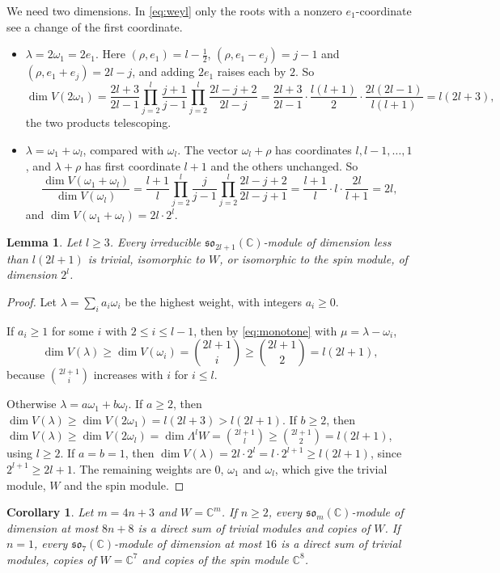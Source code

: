 \documentclass[11pt]{amsart}
\newtheorem{lemma}[theorem]{Lemma}
\newtheorem{corollary}[theorem]{Corollary}
\theoremstyle{remark}
\newcommand{\so}{\mathfrak{so}}
\newcommand{\C}{\mathbb{C}}
\begin{document}
We need two dimensions. In \eqref{eq:weyl} only the roots with a nonzero $e_1$-coordinate see a change of the first coordinate.
\begin{itemize}
\item $\lambda=2\omega_1=2e_1$. Here $(\rho,e_1)=l-\tfrac12$, $(\rho,e_1-e_j)=j-1$ and $(\rho,e_1+e_j)=2l-j$, and adding $2e_1$ raises each by $2$. So
\[
\dim V(2\omega_1)=\frac{2l+3}{2l-1}\prod_{j=2}^{l}\frac{j+1}{j-1}\prod_{j=2}^{l}\frac{2l-j+2}{2l-j}
=\frac{2l+3}{2l-1}\cdot\frac{l(l+1)}{2}\cdot\frac{2l(2l-1)}{l(l+1)}=l(2l+3),
\]
the two products telescoping.
\item $\lambda=\omega_1+\omega_l$, compared with $\omega_l$. The vector $\omega_l+\rho$ has coordinates $l,l-1,\dots,1$, and $\lambda+\rho$ has first coordinate $l+1$ and the others unchanged. So
\[
\frac{\dim V(\omega_1+\omega_l)}{\dim V(\omega_l)}=\frac{l+1}{l}\prod_{j=2}^{l}\frac{j}{j-1}\prod_{j=2}^{l}\frac{2l-j+2}{2l-j+1}=\frac{l+1}{l}\cdot l\cdot\frac{2l}{l+1}=2l,
\]
and $\dim V(\omega_1+\omega_l)=2l\cdot2^l$.
\end{itemize}

\begin{lemma}\label{lem:small}
Let $l\ge 3$. Every irreducible $\so_{2l+1}(\C)$-module of dimension less than $l(2l+1)$ is trivial, isomorphic to $W$, or isomorphic to the spin module, of dimension $2^l$.
\end{lemma}

\begin{proof}
Let $\lambda=\sum_ia_i\omega_i$ be the highest weight, with integers $a_i\ge0$.

If $a_i\ge 1$ for some $i$ with $2\le i\le l-1$, then by \eqref{eq:monotone} with $\mu=\lambda-\omega_i$,
\[
\dim V(\lambda)\ge\dim V(\omega_i)=\binom{2l+1}{i}\ge\binom{2l+1}{2}=l(2l+1),
\]
because $\binom{2l+1}{i}$ increases with $i$ for $i\le l$.

Otherwise $\lambda=a\omega_1+b\omega_l$. If $a\ge2$, then $\dim V(\lambda)\ge\dim V(2\omega_1)=l(2l+3)>l(2l+1)$. If $b\ge2$, then $\dim V(\lambda)\ge\dim V(2\omega_l)=\dim\Lambda^lW=\binom{2l+1}{l}\ge\binom{2l+1}{2}=l(2l+1)$, using $l\ge 2$. If $a=b=1$, then $\dim V(\lambda)=2l\cdot2^l=l\cdot 2^{l+1}\ge l(2l+1)$, since $2^{l+1}\ge 2l+1$. The remaining weights are $0$, $\omega_1$ and $\omega_l$, which give the trivial module, $W$ and the spin module.
\end{proof}

\begin{corollary}\label{cor:small}
Let $m=4n+3$ and $W=\C^m$. If $n\ge 2$, every $\so_m(\C)$-module of dimension at most $8n+8$ is a direct sum of trivial modules and copies of $W$. If $n=1$, every $\so_7(\C)$-module of dimension at most $16$ is a direct sum of trivial modules, copies of $W=\C^7$ and copies of the spin module $\C^8$.
\end{corollary}
\end{document}
